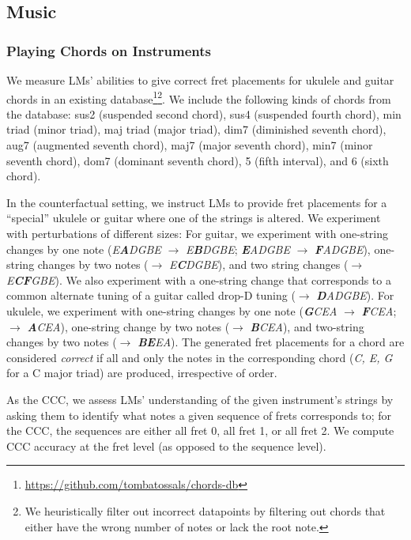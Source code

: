 \subsection{Music}

\subsubsection{Playing Chords on Instruments}

We measure LMs' abilities to give correct fret placements for ukulele and guitar chords in an existing database\footnote{\url{https://github.com/tombatossals/chords-db}}\footnote{We heuristically filter out incorrect datapoints by filtering out chords that either have the wrong number of notes or lack the root note.}. We include the following kinds of chords from the database: sus2 (suspended second chord), sus4 (suspended fourth chord), min triad (minor triad), maj triad (major triad), dim7 (diminished seventh chord), aug7 (augmented seventh chord), maj7 (major seventh chord), min7 (minor seventh chord), dom7 (dominant seventh chord), 5 (fifth interval), and 6 (sixth chord).

In the counterfactual setting, we instruct LMs to provide fret placements for a ``special'' ukulele or guitar where one of the strings is altered. We experiment with perturbations of different sizes: For guitar, we experiment with one-string changes by one note (\emph{E\textbf{A}DGBE} $\rightarrow$ \emph{E\textbf{B}DGBE}; \emph{\textbf{E}ADGBE} $\rightarrow$ \emph{\textbf{F}ADGBE}), one-string changes by two notes ($\rightarrow$ \emph{E\textbf{C}DGBE}), and two string changes ($\rightarrow$ \emph{E\textbf{CF}GBE}). We also experiment with a one-string change that corresponds to a common alternate tuning of a guitar called drop-D tuning ($\rightarrow$ \emph{\textbf{D}ADGBE}). For ukulele, we experiment with one-string changes by one note (\emph{\textbf{G}CEA} $\rightarrow$ \emph{\textbf{F}CEA}; $\rightarrow$ \emph{\textbf{A}CEA}), one-string change by two notes ($\rightarrow$ \emph{\textbf{B}CEA}), and two-string changes by two notes ($\rightarrow$ \emph{\textbf{BE}EA}).
The generated fret placements for a chord are considered \emph{correct} if all and only the notes in the corresponding chord (\eg \emph{C, E, G} for a C major triad) are produced, irrespective of order. 

As the CCC, we assess LMs' understanding of the given instrument's strings by asking them to identify what notes a given sequence of frets corresponds to; for the CCC, the sequences are either all fret 0, all fret 1, or all fret 2. We compute CCC accuracy at the fret level (as opposed to the sequence level).

